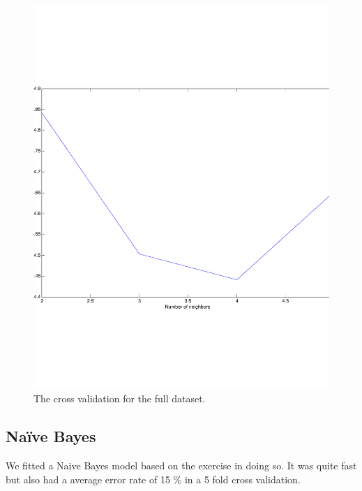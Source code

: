 \begin{figure}[H]
\centering
\includegraphics[width=\linewidth]{code/5fold_knn_60000samples}
\caption{The cross validation for the full dataset.\label{fig:knn_large}}
\end{figure}



\subsection{Naïve Bayes}
We fitted a Naive Bayes model based on the exercise in doing so. It was quite fast but also had a average error rate of 15 \% in a 5 fold cross validation.


